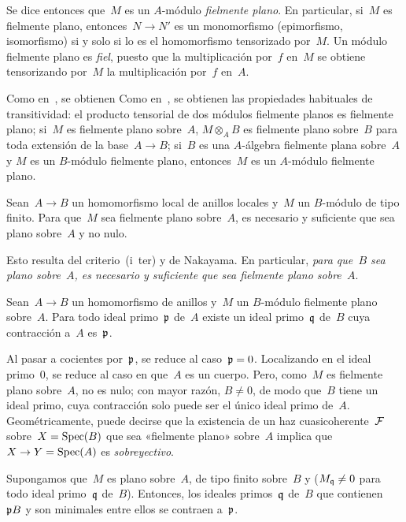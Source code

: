 Se dice entonces que~$M$ es un $A$-módulo \emph{fielmente plano}.
%
%
En particular, si~$M$ es fielmente plano, entonces~$N\to N'$ es un
monomorfismo (epimorfismo, isomorfismo) si y solo si lo es el homomorfismo
tensorizado por~$M$. Un módulo fielmente plano es \emph{fiel}, puesto que la
multiplicación por~$f$ en~$M$ se obtiene tensorizando por~$M$ la
multiplicación por~$f$ en~$A$.

{Como en~, se obtienen}
{Como en~, se obtienen}
las propiedades habituales de transitividad: el producto tensorial de dos
módulos fielmente planos es fielmente plano; si~$M$ es fielmente plano
sobre~$A$, $M\otimes_A B$ es fielmente plano sobre~$B$ para toda extensión
de la base~$A\to B$; si~$B$ es una $A$-álgebra fielmente plana sobre~$A$ y
$M$ es un $B$-módulo fielmente plano, entonces~$M$ es un $A$-módulo
fielmente plano.

\begin{corollaire}
\label{IV.2.2}
Sean~$A\to B$ un homomorfismo local de anillos locales y~$M$ un $B$-módulo
de tipo finito. Para que~$M$ sea fielmente plano sobre~$A$, es necesario y
suficiente que sea plano sobre~$A$ y no nulo.
\end{corollaire}

Esto resulta del criterio~(i~ter) y de Nakayama. En particular,
\emph{para que~$B$ sea plano sobre~$A$, es necesario y suficiente que sea
fielmente plano sobre~$A$}.

\begin{proposition}
\label{IV.2.3}
Sean~$A\to B$ un homomorfismo de anillos y~$M$ un $B$-módulo fielmente plano
sobre~$A$. Para todo ideal primo~$\goth{p}$ de~$A$ existe un ideal
primo~$\goth{q}$ de~$B$ cuya contracción a~$A$ es~$\goth{p}$.
\end{proposition}

Al pasar a cocientes por~$\goth{p}$, se reduce al caso~$\goth{p}=0$.
Localizando en el ideal primo~$0$, se reduce al caso en que~$A$ es un
cuerpo. Pero, como~$M$ es fielmente plano sobre~$A$, no es nulo; con mayor
razón, $B\neq0$, de modo que~$B$ tiene un ideal primo, cuya contracción solo
puede ser el único ideal primo de~$A$. Geométricamente, puede decirse que la
existencia de un haz cuasicoherente~$\cal{F}$ sobre~$X=\Spec(B)$ que sea
«fielmente plano» sobre~$A$ implica que~$X\to Y=\Spec(A)$ es
\emph{sobreyectivo}.

\begin{corollaire}
\label{IV.2.4}
Supongamos que~$M$ es plano sobre~$A$, de tipo finito sobre~$B$ y
(\ie $M_{\goth{q}}\neq0$ para todo ideal primo~$\goth{q}$ de~$B$). Entonces,
los ideales primos~$\goth{q}$ de~$B$ que contienen~$\goth{p}B$ y son
minimales entre ellos se contraen a~$\goth{p}$.
\end{corollaire}

